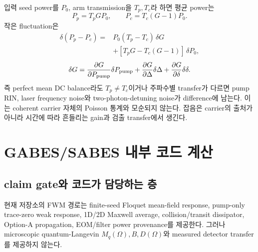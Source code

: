 \documentclass[11pt,a4paper]{article}
\begin{document}
입력 seed power를 $P_0$, arm transmission을 $T_p,T_c$라 하면 평균 power는
\begin{equation}
P_p=T_pGP_0,\qquad P_c=T_c(G-1)P_0.
\end{equation}
작은 fluctuation은
\begin{align}
\delta(P_p-P_c)={}&P_0(T_p-T_c)\,\delta G\nonumber\\
&+[T_pG-T_c(G-1)]\,\delta P_0,
\label{eq:gain-noise-leak}
\end{align}
\begin{equation}
\delta G=\frac{\partial G}{\partial P_{\rm pump}}\delta P_{\rm pump}
+\frac{\partial G}{\partial\Delta}\delta\Delta
+\frac{\partial G}{\partial\delta}\delta\delta.
\label{eq:gain-sensitivity}
\end{equation}
즉 perfect mean DC balance라도 $T_p\ne T_c$이거나 주파수별 transfer가 다르면 pump RIN,
laser frequency noise와 two-photon-detuning noise가 difference에 남는다. 이는
coherent carrier 자체의 Poisson 통계와 모순되지 않는다. 잡음은 carrier의 출처가
아니라 시간에 따라 흔들리는 gain과 검출 transfer에서 생긴다.

\section{GABES/SABES 내부 코드 계산}

\subsection{claim gate와 코드가 담당하는 층}

현재 저장소의 FWM 경로는 finite-seed Floquet mean-field response, pump-only trace-zero
weak response, 1D/2D Maxwell average, collision/transit dissipator, Option-A propagation,
EOM/filter power provenance를 제공한다. 그러나 microscopic quantum-Langevin
$M_q(\Omega),B,D(\Omega)$와 measured detector transfer를 제공하지 않는다.
\end{document}
